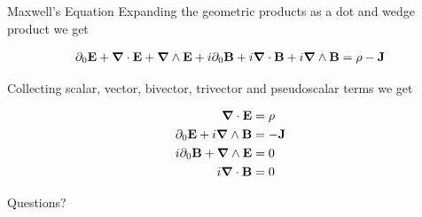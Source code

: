 \documentclass{beamer}
\begin{document}
\begin{frame}{Maxwell's Equation}
Expanding the geometric products as a dot and wedge product we get

\begin{align*}
	\partial_0 \vb E + \grad\cdot\vb E + \grad\wedge\vb E + i\partial_0\vb B + i\grad\cdot\vb B + i\grad\wedge\vb B = \rho - \vb J
\end{align*}

Collecting scalar, vector, bivector, trivector and pseudoscalar terms we get

\begin{align*}
	\grad\cdot\vb E &= \rho \\
	\partial_0\vb E + i \grad\wedge\vb B &= -\vb J \\
	i\partial_0\vb B + \grad\wedge\vb E &= 0 \\
	i\grad\cdot\vb B &= 0
\end{align*}

\end{frame}

\begin{frame}[standout]
	Questions?
\end{frame}
\end{document}
